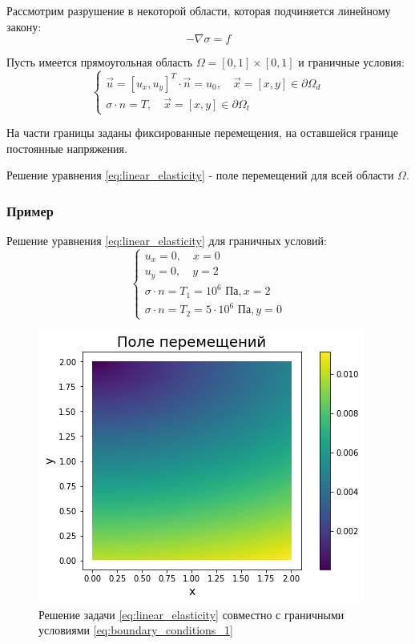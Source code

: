 
Рассмотрим разрушение в некоторой области, которая подчиняется линейному закону:
\begin{equation}
	\label{eq:linear_elasticity}
	-\nabla \sigma = f
\end{equation}

Пусть имеется прямоугольная область $\Omega = [0, 1] \times [0, 1]$ и граничные условия:
\begin{equation*}
	\begin{cases}
		\vec{u} = \left [ u_x, u_y \right ]^T \cdot \vec{n}  = u_{0}, \quad \vec{x} = \left [ x, y \right ] \in \partial \Omega_d \\
		\sigma \cdot n = T, \quad \vec{x} = \left [ x, y \right ] \in \partial \Omega_t
	\end{cases}
\end{equation*}

На части границы заданы фиксированные перемещения, на оставшейся границе постоянные напряжения.

Решение уравнения \eqref{eq:linear_elasticity} - поле перемещений для всей области $\Omega$.

\subsubsection{Пример}
Решение уравнения \eqref{eq:linear_elasticity} для граничных условий:
\begin{equation}
	\label{eq:boundary_conditions_1}
	\begin{cases}
		u_x = 0, \quad x = 0 \\
		u_y = 0, \quad y = 2 \\
		\sigma \cdot n = T_1 = 10^6 \text{ Па}, x = 2 \\
		\sigma \cdot n = T_2 = 5 \cdot 10^6 \text{ Па}, y = 0
	\end{cases}
\end{equation}

\begin{figure}
	\centering
	\includegraphics[width=0.65 \textwidth]{images/part2/solution_displacement_1.png}
	\caption{Решение задачи \eqref{eq:linear_elasticity} совместно с граничными условиями \eqref{eq:boundary_conditions_1}}
	\label{fig:solution_1}
\end{figure}

